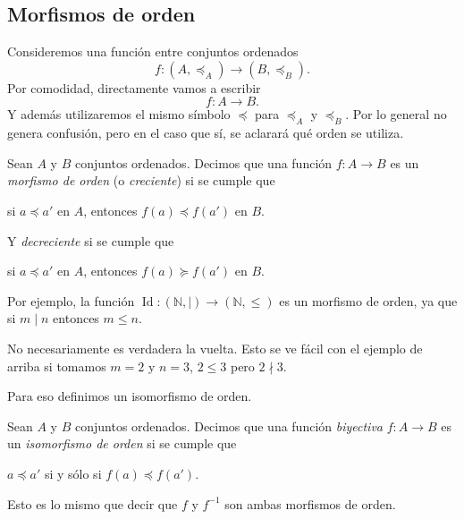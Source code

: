 \subsection{Morfismos de orden}

Consideremos una función entre conjuntos ordenados
$$
    f: (A, \preceq_{A}) \to (B, \preceq_{B}).
$$
Por comodidad, directamente vamos a escribir
$$
    f: A \to B.
$$
Y además utilizaremos el mismo símbolo $\preceq$ para $\preceq_{A}$ y $\preceq_{B}$. Por lo general no genera confusión, pero en el caso que sí, se aclarará qué orden se utiliza.

\begin{definition}
    Sean $A$ y $B$ conjuntos ordenados. Decimos que una función $f: A \to B$ es un \emph{morfismo de orden} (o \emph{creciente}) si se cumple que
    \begin{center}
        si $a \preceq a'$ en $A$, entonces $f(a) \preceq f(a')$ en $B$.
    \end{center}
    Y \emph{decreciente} si se cumple que 
    \begin{center}
        si $a \preceq a'$ en $A$, entonces $f(a) \succeq f(a')$ en $B$.
    \end{center}
\end{definition}

Por ejemplo, la función $\operatorname{Id}: (\mathbb{N}, \mid ) \to (\mathbb{N}, \leq)$ es un morfismo de orden, ya que si $m \mid n$ entonces $m \leq n$.

\begin{remark}
    No necesariamente es verdadera la vuelta. Esto se ve fácil con el ejemplo de arriba si tomamos $m = 2$ y $n = 3$, $2 \leq 3$ pero $2 \nmid 3$.
\end{remark}

Para eso definimos un isomorfismo de orden.

\begin{definition}
    Sean $A$ y $B$ conjuntos ordenados. Decimos que una función \textit{biyectiva} $f: A \to  B$ es un \emph{isomorfismo de orden} si se cumple que
    \begin{center}
        $a \preceq a'$ si y sólo si $f(a) \preceq f(a')$.
    \end{center}
\end{definition}

\begin{remark}
    Esto es lo mismo que decir que $f$ y $f^{-1}$ son ambas morfismos de orden.
\end{remark}

